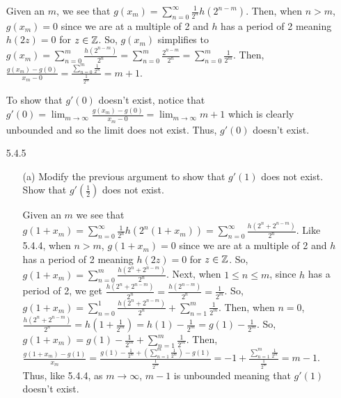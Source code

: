 \documentclass[12pt,letterpaper]{article}
\begin{document}
\begin{itemize}[leftmargin=!,labelindent=5pt]
            Given an $m$, we see that $g(x_m) = \sum_{n=0}^{\infty}\frac{1}{2^n}h(2^{n-m})$.
            Then, when $n > m$, $g(x_m) = 0$ since we are at a multiple of 2 and $h$ has a period of 2 meaning $h(2z) = 0$ for $z\in\mathbb{Z}$.
            So, $g(x_m)$ simplifies to $g(x_m) = \sum_{n=0}^{m}\frac{h(2^{n-m})}{2^n} = \sum_{n=0}^{m}\frac{2^{n-m}}{2^n} = \sum_{n=0}^{m}\frac{1}{2^m}$.
            Then, $\frac{g(x_m) - g(0)}{x_m - 0} = \frac{\sum_{n=0}^{m}\frac{1}{2^m}}{\frac{1}{2^m}} =  m+1$.
            
            To show that $g'(0)$ doesn't exist, notice that $g'(0) = \lim_{m\to\infty}\frac{g(x_m) - g(0)}{x_m - 0} = \lim_{m\to\infty} m+1$ which is clearly unbounded and so the limit does not exist.
            Thus, $g'(0)$ doesn't exist.
        \item [5.4.5] 
            \begin{itemize}
                \item [(a)] Modify the previous argument to show that $g'(1)$ does not exist. Show that $g'(\frac{1}{2})$ does not exist.

                    Given an $m$ we see that $g(1 + x_m) = \sum_{n=0}^{\infty} \frac{1}{2^n}h(2^n (1+x_m)) = \sum_{n=0}^{\infty} \frac{h(2^n + 2^{n-m})}{2^n}$.
                    Like 5.4.4, when $n > m$, $g(1 + x_m) = 0$ since we are at a multiple of 2 and $h$ has a period of 2 meaning $h(2z) = 0$ for $z\in\mathbb{Z}$.
                    So, $g(1 + x_m) = \sum_{n=0}^{m} \frac{h(2^n + 2^{n-m})}{2^n}$.
                    Next, when $1 \leq n \leq m$, since $h$ has a period of 2, we get $\frac{h(2^n + 2^{n-m})}{2^n} = \frac{h(2^{n-m})}{2^n} = \frac{1}{2^m}$.
                    So, $g(1 + x_m) = \sum_{n=0}^{1}\frac{h(2^n + 2^{n-m})}{2^n} + \sum_{n=1}^{m} \frac{1}{2^m}$.
                    Then, when $n=0$, $\frac{h(2^n + 2^{n-m})}{2^n} = h(1 + \frac{1}{2^{m}}) = h(1) - \frac{1}{2^{m}} = g(1) - \frac{1}{2^{m}}$.
                    So, $g(1 + x_m) = g(1) - \frac{1}{2^{m}} + \sum_{n=1}^{m} \frac{1}{2^m}$.
                    Then, $\frac{g(1+x_m) - g(1)}{x_m} = \frac{g(1) - \frac{1}{2^{m}} + (\sum_{n=1}^{m} \frac{1}{2^m}) - g(1)}{\frac{1}{2^m}} = -1 + \frac{\sum_{n=1}^{m} \frac{1}{2^m}}{\frac{1}{2^m}} = m-1$.
                    Thus, like 5.4.4, as $m\to \infty$, $m-1$ is unbounded meaning that $g'(1)$ doesn't exist.
                    \ \\
                    

\end{itemize}
\end{itemize}
\end{document}
